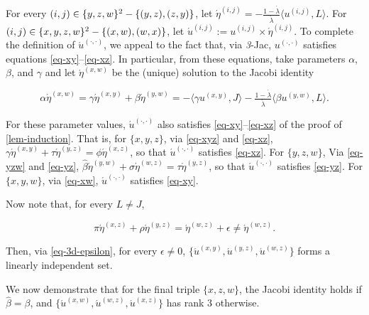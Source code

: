 \documentclass[12pt,a4paper,twoside]{article}
\renewcommand{\ij}{{(i, j)}}
\newcommand{\xy}{{(x, y)}}
\newcommand{\yz}{{(y,z)}}
\newcommand{\xz}{{(x,z)}}
\newcommand{\xw}{{(x,w)}}
\newcommand{\yw}{{(y,w)}}
\newcommand{\wz}{(w,z)}
\newcommand{\dd}{{(\cdot,\cdot)}}
\newcommand{\threejac}{\textup{\textit{3}-Jac}}
\begin{document}
\begin{appendices}
For every $(i, j) \in \{y,z,w\}^2 - \{(y, z), (z, y)\}$, let
$\acute{\eta}^{\ij} = - \frac{1 - \acute{\lambda}}{\acute{\lambda}} \langle
u^{\ij}, L \rangle$.  For $(i, j) \in \{x, y , z, w\}^2 - \{(x, w), (w,
x)\}$, let $\acute{u}^{\ij}:= u^{\ij} \times \acute{\eta}^{\ij}$.  To complete
the definition of $\acute{u}^{\dd}$, we appeal to the fact that, via \threejac,
$u^{\dd}$ satisfies equations \eqref{eq-xy}--\eqref{eq-xz}. In particular, from
these equations, take parameters $\alpha$, $\beta$, and $\gamma$ and let
$\acute{\eta}^{\xw}$ be the (unique) solution to the Jacobi identity
\begin{linenomath*}
  \begin{equation}\label{eq-xw}
    \alpha \acute{\eta}^{\xw} = \gamma \acute{\eta}^{\xy} + \beta
    \acute{\eta}^{\yw} = -\langle \gamma u^{\xy} , J \rangle -
    \tfrac{1-\acute{\lambda}}{\acute{\lambda}}\langle\beta u^{\yw}, L \rangle.
  \end{equation}
\end{linenomath*}
For these parameter values, $\acute{u}^{\dd}$ also satisfies
\eqref{eq-xy}--\eqref{eq-xz} of the proof of \cref{lem-induction}. That is, for
$\{x,y,z\}$, via \cref{eq-xyz} and \eqref{eq-xz}, $\gamma
\acute{\eta}^{\xy}+\tau \acute{\eta}^{\yz} = \phi \acute{\eta}^{\xz}$, so that
$\acute{u}^{\dd}$ satisfies \eqref{eq-xz}. For $\{y,z,w\}$, Via \cref{eq-yzw}
and \eqref{eq-yz}, $\hat{\beta} \acute{\eta}^{\yw}+\sigma \acute{\eta}^{\wz} =
\tau \acute{\eta}^{\yz}$, so that $\acute{u}^{\dd}$ satisfies \eqref{eq-yz}.
For $\{x,y,w\}$, via \cref{eq-xw}, $\acute{u}^{\dd}$ satisfies \eqref{eq-xy}.

Now note that, for every $L \neq J$,
\begin{linenomath*}
  \begin{equation}\label{eq-3d-epsilon}
    \pi \acute{\eta}^{\xz} + \rho \acute{\eta}^{\yz} = \acute{\eta}^{\wz} +
    \epsilon \neq \acute{\eta}^{\wz}.
  \end{equation}
\end{linenomath*}
Then, via
\eqref{eq-3d-epsilon}, for every $\epsilon\neq 0$, $\{\acute{u}^{\xy},
\acute{u}^{\yz}, \acute{u}^{\wz}\}$ forms a linearly independent set.

We now demonstrate that for the final triple $\{x,z,w\}$, the Jacobi identity
holds if $\hat{\beta} = \beta$, and
$\{\acute{u}^{\xw},\acute{u}^{\wz},\acute{u}^{\xz}\}$ has rank $3$ otherwise.


\end{appendices}
\end{document}
